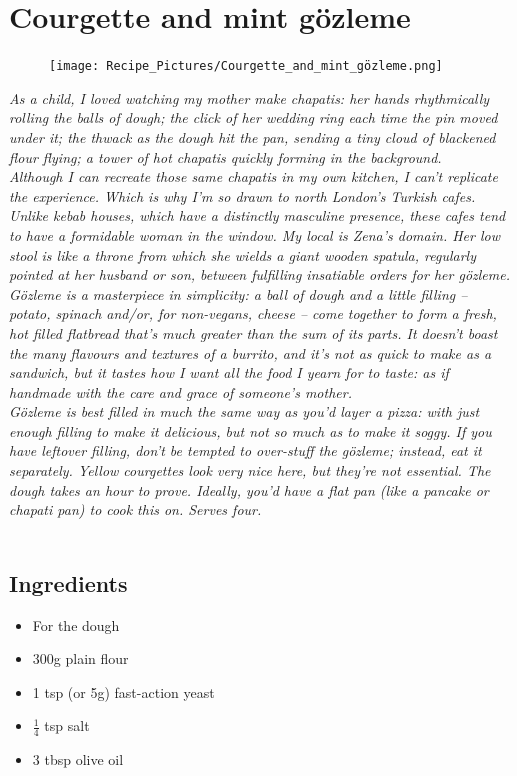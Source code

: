\documentclass{book}
\begin{document}
\section{Courgette and mint gözleme}
\begin{figure}
\centering\texttt{[image: Recipe\_Pictures/Courgette\_and\_mint\_gözleme.png]}
\end{figure}
\emph{As a child, I loved watching my mother make chapatis: her hands rhythmically rolling the balls of dough; the click of her wedding ring each time the pin moved under it; the thwack as the dough hit the pan, sending a tiny cloud of blackened flour flying; a tower of hot chapatis quickly forming in the background.\\ 
Although I can recreate those same chapatis in my own kitchen, I can’t replicate the experience. Which is why I’m so drawn to north London’s Turkish cafes. Unlike kebab houses, which have a distinctly masculine presence, these cafes tend to have a formidable woman in the window. My local is Zena’s domain. Her low stool is like a throne from which she wields a giant wooden spatula, regularly pointed at her husband or son, between fulfilling insatiable orders for her gözleme.\\ 
Gözleme is a masterpiece in simplicity: a ball of dough and a little filling – potato, spinach and/or, for non-vegans, cheese – come together to form a fresh, hot filled flatbread that’s much greater than the sum of its parts. It doesn’t boast the many flavours and textures of a burrito, and it’s not as quick to make as a sandwich, but it tastes how I want all the food I yearn for to taste: as if handmade with the care and grace of someone’s mother.\\ 
Gözleme is best filled in much the same way as you’d layer a pizza: with just enough filling to make it delicious, but not so much as to make it soggy. If you have leftover filling, don’t be tempted to over-stuff the gözleme; instead, eat it separately. Yellow courgettes look very nice here, but they’re not essential. The dough takes an hour to prove. Ideally, you’d have a flat pan (like a pancake or chapati pan) to cook this on. Serves four.}\\\\ 
\subsection*{Ingredients}
\begin{itemize}
\item For the dough
\item 300g plain flour 
\item 1 tsp (or 5g) fast-action yeast 
\item $\frac{1}{4}$ tsp salt 
\item 3 tbsp olive oil 
\end{itemize}
\end{document}
